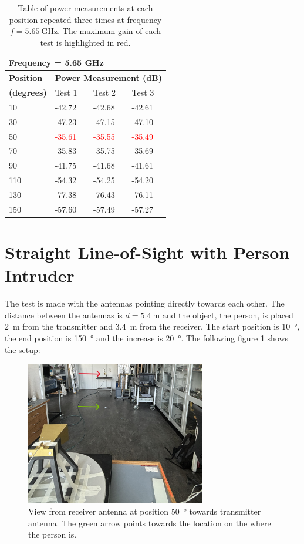 \begin{table}[H]
    \centering
    \begin{tabular}{l|l|l|l}
        \multicolumn{4}{l}{\textbf{Frequency = 5.65 GHz}}         \\
        \hline
        \textbf{Position} & \multicolumn{3}{l}{\textbf{Power Measurement (dB)}} \\
        \textbf{(degrees)}  & Test 1    & Test 2  & Test 3  \\
        \hline
        \hline
        10      & -42.72    & -42.68    & -42.61 \\
        30      & -47.23    & -47.15    & -47.10 \\
        50      & \textcolor{red}{-35.61}    & \textcolor{red}{-35.55}    & \textcolor{red}{-35.49} \\
        70      & -35.83    & -35.75    & -35.69 \\
        90      & -41.75    & -41.68    & -41.61 \\
        110     & -54.32    & -54.25    & -54.20 \\
        130     & -77.38    & -76.43    & -76.11 \\
        150     & -57.60    & -57.49    & -57.27
        \end{tabular}
    \caption{Table of power measurements at each position repeated three times at frequency $f=\SI{5.65}{\giga\hertz}$. The maximum gain of each test is highlighted in red.}
    \label{tab:a2_4b}
\end{table}

\section{Straight Line-of-Sight with Person Intruder}
The test is made with the antennas pointing directly towards each other. The distance between the antennas is $d=\SI{5.4}{\meter}$ and the object, the person, is placed \SI{2}{\meter} from the transmitter and \SI{3.4}{\meter} from the receiver. The start position is \SI{10}{\degree}, the end position is \SI{150}{\degree} and the increase is \SI{20}{\degree}. The following figure \ref{fig:a2_5} shows the setup:
\begin{figure}[H]
    \centering
    \includegraphics[width=0.7\textwidth]{figures/test_intruder_person.JPG}
    \caption{View from receiver antenna at position \SI{50}{\degree} towards transmitter antenna. The green arrow points towards the location on the where the person is.} \label{fig:a2_5}
\end{figure}

